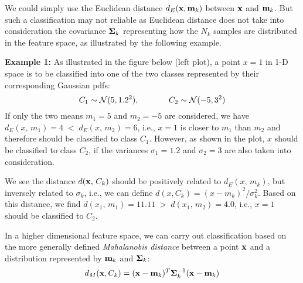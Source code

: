 \documentclass{article}
\begin{document}
\begin{itemize}
  We could simply use the Euclidean distance $d_E({\bf x},{\bf m}_k)$
  between ${\bf x}$ and ${\bf m}_k$. But such a classification may not 
  reliable as Euclidean distance does not take into consideration the
  covariance ${\bf\Sigma}_k$ representing how the $N_k$ samples are 
  distributed in the feature space, as illustrated by the following
  example.

  {\bf Example 1:} As illustrated in the figure below (left plot), a
  point $x=1$ in 1-D space is to be classified into one of the two 
  classes represented by their corresponding Gaussian pdfs:
  \begin{equation}
    C_1\sim{\cal N}( 5, 1.2^2),\;\;\;\;\;\;\;\;\;\;\;\;\;
    C_2\sim{\cal N}(-5, 3^2)
  \end{equation}
  If only the two means $m_1=5$ and $m_2=-5$ are considered, we have
  $d_E(x,\,m_1)=4\;<\;d_E(x,\,m_2)=6$, i.e., $x=1$ is closer to $m_1$ 
  than $m_2$ and therefore should be classified to class $C_1$. However,
  as shown in the plot, $x$ should be classified to class $C_2$, if the 
  variances $\sigma_1=1.2$ and $\sigma_2=3$ are also taken into consideration. 
  

  We see the distance $d({\bf x},\,C_k)$ should be positively related 
  to $d_E(x,\,m_k)$, but inversely related to $\sigma_k$, i.e., we can
  define $d(x,C_k)=(x-m_k)^2/\sigma_k^2$. Based on this distance, we find
  $d(x_1,\,m_1)=11.11 \;>\;d(x_1,\,m_2)=4.0$, i.e., $x=1$ should be
  classified to $C_2$.

  In a higher dimensional feature space, we can carry out classification 
  based on the more generally defined {\em Mahalanobis distance} between 
  a point ${\bf x}$ and a distribution represented by ${\bf m}_k$ and 
  ${\bf\Sigma}_k$:
  \begin{equation}
    d_M({\bf x},C_k)=({\bf x}-{\bf m}_k)^T{\bf \Sigma}_k^{-1}({\bf x}-{\bf m}_k)
  \end{equation}


\end{itemize}
\end{document}
